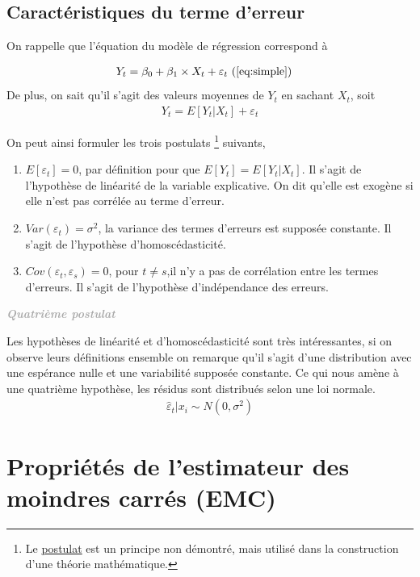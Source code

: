 \documentclass[11pt,french]{report}
\newenvironment{moreInfo}[1]
	{\begin{mdframed}
	\textcolor{darkgray}{\huge \raisebox{-3.5pt}{\faInfo} 
	\hspace{0.5cm} \large\bfseries #1}\\[5pt]
	\normalsize
	\makebox[0.1\textwidth][l]{}	
	\begin{minipage}{10cm}}
	{	\end{minipage}
	\end{mdframed}}
\begin{document}
\subsection{Caractéristiques du terme d'erreur}
On rappelle que l'équation du modèle de régression correspond à 

\begin{align*}
Y_t &= \beta_0 + \beta_1\times X_t + \varepsilon_t \text{ (\ref{eq:simple})}
\end{align*}
De plus, on sait qu'il s'agit des valeurs moyennes de $Y_t$ en sachant $X_t$, soit
\begin{align*}
Y_t = E[Y_t|X_t] + \varepsilon_t 
\end{align*}

On peut ainsi formuler les trois postulats \footnote{Le \href{https://fr.wikipedia.org/wiki/Postulat}{postulat} est un principe non démontré, mais utilisé dans la construction d'une théorie mathématique. } suivants,
\begin{enumerate}
\item \label{post1} $E[\varepsilon_t] = 0$, par définition pour que $E[Y_t] = E[Y_t|X_t]$. Il s'agit de l'hypothèse de linéarité de la variable explicative. On dit qu'elle est exogène si elle n'est pas corrélée au terme d'erreur.
\item \label{post2} $Var(\varepsilon_t) = \sigma^2$, la variance des termes d'erreurs est supposée constante. Il s'agit de l'hypothèse d'homoscédasticité.
\item \label{post3} $Cov(\varepsilon_t, \varepsilon_s) = 0$, pour $t \neq s$,il n'y a pas de corrélation entre les termes d'erreurs. Il s'agit de l'hypothèse d'indépendance des erreurs.
\end{enumerate}

\bigskip
\begin{moreInfo}{\emph{Quatrième postulat}}
\label{post4}
	Les hypothèses de linéarité et d'homoscédasticité sont très intéressantes, si on observe leurs définitions ensemble on remarque qu'il s'agit d'une distribution avec une espérance nulle et une variabilité supposée constante. Ce qui nous amène à une quatrième hypothèse, les résidus sont distribués selon une loi normale.
	\begin{align*}
\hat{\varepsilon}_t|x_i \sim N(0, \sigma^2)
	\end{align*}
\end{moreInfo}
\bigskip

\section{Propriétés de l'estimateur des moindres carrés (EMC)}
\label{sec:EMC}
\end{document}
